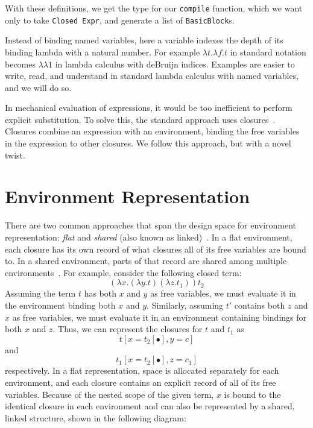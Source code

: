 \documentclass[preprint]{sigplanconf}
\begin{document}
With these definitions, we get the type for our \texttt{compile} function, which
we want only to take \texttt{Closed Expr}, and generate a list of
\texttt{BasicBlock}s.

Instead of binding named variables, here a variable indexes the depth of its
binding lambda with a natural number. For example $\lambda t.\lambda f.t$ in
standard notation becomes $\lambda\lambda1$ in lambda calculus with deBruijn
indices.  Examples are easier to write, read, and understand in standard lambda
calculus with named variables, and we will do so.

In mechanical evaluation of expressions, it would be too inefficient to perform
explicit substitution. To solve this, the standard approach uses
closures~\cite{landin1964mechanical, curien1991abstract, jonesstg, biernacka2007concrete}.
Closures combine an expression with an environment, binding the free
variables in the expression to other closures.  We follow this approach, but
with a novel twist. 

\section{Environment Representation} \label{sec:env}

There are two common approaches that span the design space for environment
representation: \emph{flat} and \emph{shared} (also
known as linked)~\cite{appel1988optimizing, shao1994space}. In a flat
environment, each closure has its own record of what closures all
of its free variables are bound to. In a shared environment, parts
of that record are shared among multiple environments~\cite{appel1988optimizing,
shao1994space}. For example, consider the following closed term: $$(\lambda
x.(\lambda y.t) (\lambda z.t_1)) t_2$$ Assuming the term $t$ has both $x$ and
$y$ as free variables, we must evaluate it in the environment binding both $x$
and $y$.  Similarly, assuming $t'$ contains both $z$ and $x$ as free variables,
we must evaluate it in an environment containing bindings for both $x$ and $z$.
Thus, we can represent the closures for $t$ and $t_1$ as $$t[x=t_2[\bullet],
y=c]$$ and $$t_1[x=t_2[\bullet], z=c_1]$$ respectively. In a flat
representation, space is allocated separately for each environment, and each
closure contains an explicit record of all of its free variables. Because of the
nested scope of the given term, $x$ is bound to the identical closure in each
environment and can also be represented by a shared, linked structure, shown in
the following diagram:
\end{document}
